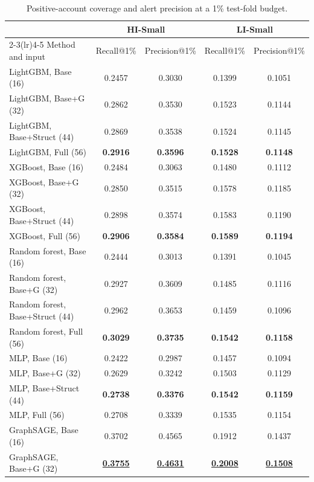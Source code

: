 \begin{table}[htbp]
\centering
\footnotesize
\setlength{\tabcolsep}{5pt}
\caption{Positive-account coverage and alert precision at a 1\% test-fold budget.}
\label{tab:budget}
\begin{threeparttable}
\begin{tabular}{lcccc}
\toprule
& \multicolumn{2}{c}{HI-Small} & \multicolumn{2}{c}{LI-Small} \\
\cmidrule(lr){2-3}\cmidrule(lr){4-5}
Method and input & Recall@1\% & Precision@1\% & Recall@1\% & Precision@1\% \\
\midrule
LightGBM, Base (16) & 0.2457 & 0.3030 & 0.1399 & 0.1051 \\
LightGBM, Base+G (32) & 0.2862 & 0.3530 & 0.1523 & 0.1144 \\
LightGBM, Base+Struct (44) & 0.2869 & 0.3538 & 0.1524 & 0.1145 \\
LightGBM, Full (56) & \textbf{0.2916} & \textbf{0.3596} & \textbf{0.1528} & \textbf{0.1148} \\
\addlinespace
XGBoost, Base (16) & 0.2484 & 0.3063 & 0.1480 & 0.1112 \\
XGBoost, Base+G (32) & 0.2850 & 0.3515 & 0.1578 & 0.1185 \\
XGBoost, Base+Struct (44) & 0.2898 & 0.3574 & 0.1583 & 0.1190 \\
XGBoost, Full (56) & \textbf{0.2906} & \textbf{0.3584} & \textbf{0.1589} & \textbf{0.1194} \\
\addlinespace
Random forest, Base (16) & 0.2444 & 0.3013 & 0.1391 & 0.1045 \\
Random forest, Base+G (32) & 0.2927 & 0.3609 & 0.1485 & 0.1116 \\
Random forest, Base+Struct (44) & 0.2962 & 0.3653 & 0.1459 & 0.1096 \\
Random forest, Full (56) & \textbf{0.3029} & \textbf{0.3735} & \textbf{0.1542} & \textbf{0.1158} \\
\addlinespace
MLP, Base (16) & 0.2422 & 0.2987 & 0.1457 & 0.1094 \\
MLP, Base+G (32) & 0.2629 & 0.3242 & 0.1503 & 0.1129 \\
MLP, Base+Struct (44) & \textbf{0.2738} & \textbf{0.3376} & \textbf{0.1542} & \textbf{0.1159} \\
MLP, Full (56) & 0.2708 & 0.3339 & 0.1535 & 0.1154 \\
\addlinespace
GraphSAGE, Base (16) & 0.3702 & 0.4565 & 0.1912 & 0.1437 \\
GraphSAGE, Base+G (32) & \underline{\textbf{0.3755}} & \underline{\textbf{0.4631}} & \underline{\textbf{0.2008}} & \underline{\textbf{0.1508}} \\

\end{tabular}
\end{threeparttable}
\end{table}
